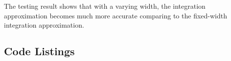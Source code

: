 \documentclass[a4paper,titlepage]{article}
\begin{document}
			The testing result shows that with a varying width, the integration approximation becomes much more accurate comparing to the fixed-width integration approximation. 
		
	\newpage
	\onecolumn
	\begin{appendices}
		
		\section{Code Listings} \label{appendix:code}
		
		
		\begin{center}
			\inputminted{python}{../polynomial.py}
			\label{lst:poly}
		\end{center}
		\begin{center}
			\inputminted{python}{../interpolation.py}
			\label{lst:interp}
		\end{center}
		\begin{center}
			\inputminted{python}{../nonlinear.py}
			\label{lst:nonlinear}
		\end{center}
		\begin{center}
			\inputminted{python}{../integration.py}
			\label{lst:inte}
		\end{center}
	\end{appendices}
\end{document}
